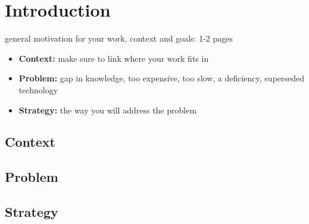 \chapter{Introduction}
\label{sec:introduction}

\begin{tcolorbox}[title=TODO]
general motivation for your work, context and goals: 1-2 pages

\begin{itemize}
\item \textbf{Context:} make sure to link where your work fits in
\item \textbf{Problem:} gap in knowledge, too expensive, too slow, a deficiency, superseded technology
\item \textbf{Strategy:} the way you will address the problem
\end{itemize}
\end{tcolorbox}

\section{Context}
\section{Problem}
\section{Strategy}
